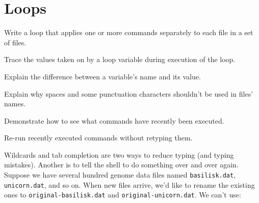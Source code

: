 \documentclass{book}
\begin{document}

\section{Loops}

\begin{objectives}
\begin{swcitemize}
\item
  Write a loop that applies one or more commands separately to each file
  in a set of files.
\item
  Trace the values taken on by a loop variable during execution of the
  loop.
\item
  Explain the difference between a variable's name and its value.
\item
  Explain why spaces and some punctuation characters shouldn't be used
  in files' names.
\item
  Demonstrate how to see what commands have recently been executed.
\item
  Re-run recently executed commands without retyping them.
\end{swcitemize}
\end{objectives}

Wildcards and tab completion are two ways to reduce typing (and typing
mistakes). Another is to tell the shell to do something over and over
again. Suppose we have several hundred genome data files named
\texttt{basilisk.dat}, \texttt{unicorn.dat}, and so on. When new files
arrive, we'd like to rename the existing ones to
\texttt{original-basilisk.dat} and \texttt{original-unicorn.dat}. We
can't use:

\end{document}
